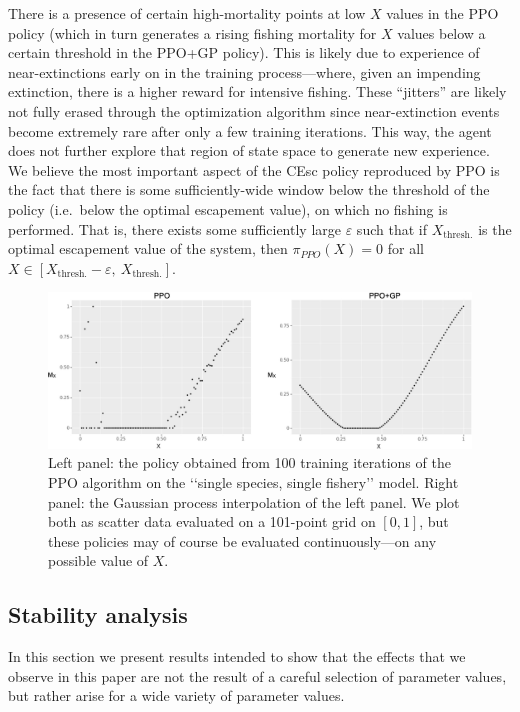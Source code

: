 \documentclass{article}
\begin{document}
There is a presence of certain high-mortality points at low \(X\) values
in the PPO policy (which in turn generates a rising fishing mortality
for \(X\) values below a certain threshold in the PPO+GP policy). This
is likely due to experience of near-extinctions early on in the training
process---where, given an impending extinction, there is a higher reward
for intensive fishing. These ``jitters'' are likely not fully erased
through the optimization algorithm since near-extinction events become
extremely rare after only a few training iterations. This way, the agent
does not further explore that region of state space to generate new
experience. We believe the most important aspect of the CEsc policy
reproduced by PPO is the fact that there is some sufficiently-wide
window below the threshold of the policy (i.e.~below the optimal
escapement value), on which no fishing is performed. That is, there
exists some sufficiently large \(\varepsilon\) such that if
\(X_{\text{thresh.}}\) is the optimal escapement value of the system,
then \(\pi_{PPO}(X)=0\) for all
\(X\in[X_{\text{thresh.}}-\varepsilon,\ X_{\text{thresh.}}]\).

\begin{figure}
  \centering
  \includegraphics[scale=0.25]{figures/1sp-policy.jpeg}
  \caption{Left panel: the policy obtained from 100 training iterations of the PPO algorithm on the ‘‘single species, single fishery’’ model. Right panel: the Gaussian process interpolation of the left panel. We plot both as scatter data evaluated on a 101-point grid on $[0,1]$, but these policies may of course be evaluated continuously---on any possible value of $X$.}
  \label{fig:1sp-pol}
\end{figure}

\hypertarget{stability-analysis}{%
\subsection{Stability analysis}\label{stability-analysis}}

In this section we present results intended to show that the effects
that we observe in this paper are not the result of a careful selection
of parameter values, but rather arise for a wide variety of parameter
values.
\end{document}
